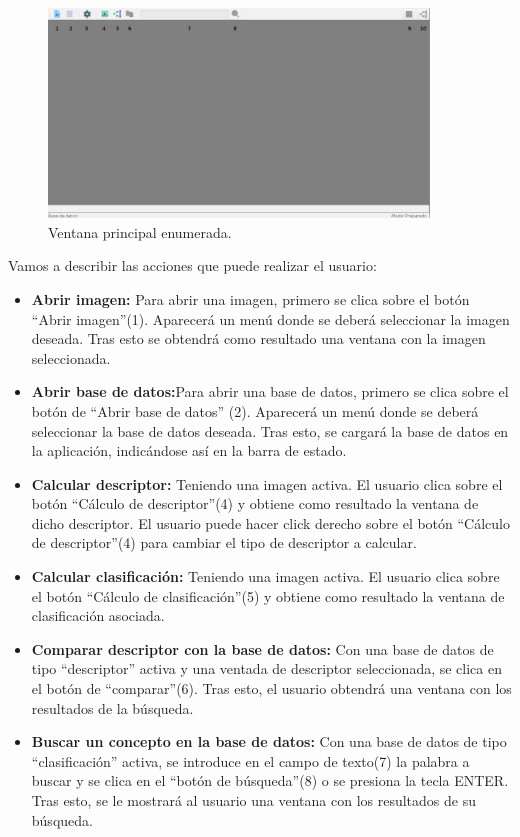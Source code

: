 \begin{figure}[H]
\begin{center}

\includegraphics[width=0.9\textwidth]{img/v-principal-enum.png}
\end{center}

\caption{Ventana principal enumerada.}
\end{figure}
Vamos a describir las acciones que puede realizar el usuario:
\begin{itemize}
\item \textbf{Abrir imagen: }Para abrir una imagen, primero se clica sobre el botón ``Abrir imagen''(1). Aparecerá un menú donde se deberá seleccionar la imagen deseada. Tras esto se obtendrá como resultado una ventana con la imagen seleccionada.
\item \textbf{Abrir base de datos:}Para abrir una base de datos, primero se clica sobre el botón de ``Abrir base de datos'' (2). Aparecerá un menú donde se deberá seleccionar la base de datos deseada. Tras esto, se cargará la base de datos en la aplicación, indicándose así en la barra de estado.
\item \textbf{Calcular descriptor: } Teniendo una imagen activa. El usuario clica sobre el botón  ``Cálculo de descriptor''(4) y obtiene como resultado la ventana de dicho descriptor. El usuario puede hacer click derecho sobre el botón ``Cálculo de descriptor''(4) para cambiar el tipo de descriptor a calcular.
\item \textbf{Calcular clasificación: } Teniendo una imagen activa.  El usuario clica sobre el botón  ``Cálculo de clasificación''(5) y obtiene como resultado la ventana de clasificación asociada.
\item \textbf{Comparar descriptor con la base de datos: } Con una base de datos de tipo ``descriptor'' activa y una ventada de descriptor seleccionada, se clica en el botón de ``comparar''(6). Tras esto, el usuario obtendrá una ventana con los resultados de la búsqueda.
\item \textbf{Buscar un concepto en la base de datos: } Con una base de datos de tipo ``clasificación'' activa, se introduce en el campo de texto(7) la palabra a buscar y se clica en el ``botón de búsqueda''(8) o se presiona la tecla ENTER. Tras esto, se le mostrará al usuario una ventana con los resultados de su búsqueda.
\end{itemize}